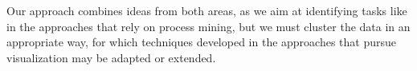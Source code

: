 Our approach combines ideas from both areas, as we aim at identifying tasks like in the approaches that rely on process mining, but we must cluster the data in an appropriate way, for which techniques developed in the approaches that pursue visualization may be adapted or extended.

%
